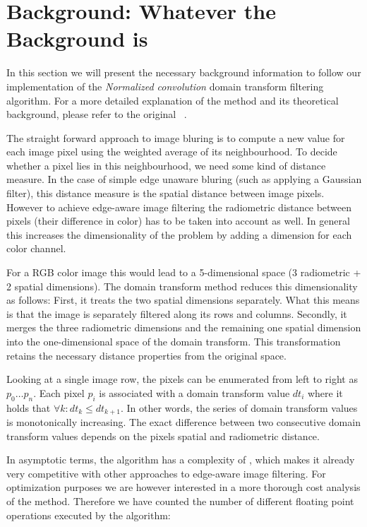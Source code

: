 \section{Background: Whatever the Background is}\label{sec:background}

In this section we will present the necessary background information to follow our implementation of the \textit{Normalized convolution} domain transform filtering algorithm. For a more detailed explanation of the method and its theoretical background, please refer to the original ~\cite{GastalOliveira2011DomainTransform}.

The straight forward approach to image bluring is to compute a new value for each image pixel using the weighted average of its neighbourhood. To decide whether a pixel lies in this neighbourhood, we need some kind of distance measure. In the case of simple edge unaware bluring (such as applying a Gaussian filter), this distance measure is the spatial distance between image pixels. However to achieve edge-aware image filtering the radiometric distance between pixels (their difference in color) has to be taken into account as well.
In general this increases the dimensionality of the problem by adding a dimension for each color channel.

For a RGB color image this would lead to a 5-dimensional space (3 radiometric + 2 spatial dimensions). The domain transform method reduces this dimensionality as follows:
First, it treats the two spatial dimensions separately. What this means is that the image is separately filtered along its rows and columns. Secondly, it merges the three radiometric dimensions and the remaining one spatial dimension into the one-dimensional space of the domain transform. This transformation retains the necessary distance properties from the original space.

Looking at a single image row, the pixels can be enumerated from left to right as $ p_0 \dots p_n$. Each pixel $p_i$ is associated with a domain transform value $dt_i$ where it holds that $\forall k : dt_k \leq dt_{k+1}$. In other words, the series of domain transform values is monotonically increasing. The exact difference between two consecutive domain transform values depends on the pixels spatial and radiometric distance.



In asymptotic terms, the algorithm has a complexity of , which makes it already very competitive with other approaches to edge-aware image filtering. For optimization purposes we are however interested in a more thorough cost analysis of the method. Therefore we have counted the number of different floating point operations executed by the algorithm:


